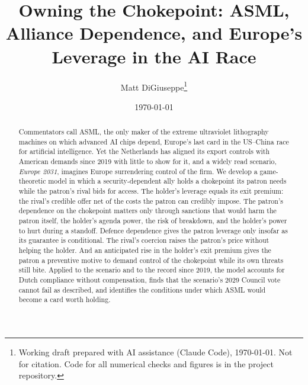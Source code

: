 \documentclass[11pt]{article}
\title{Owning the Chokepoint: ASML, Alliance Dependence, and Europe's Leverage in the AI Race}
\author{Matt DiGiuseppe\thanks{Working draft prepared with AI assistance (Claude Code), \today. Not for citation. Code for all numerical checks and figures is in the project repository.}}
\date{\today}
\begin{document}
\maketitle

\begin{abstract}
\noindent Commentators call ASML, the only maker of the extreme ultraviolet lithography machines on which advanced AI chips depend, Europe's last card in the US--China race for artificial intelligence. Yet the Netherlands has aligned its export controls with American demands since 2019 with little to show for it, and a widely read scenario, \emph{Europe 2031}, imagines Europe surrendering control of the firm. We develop a game-theoretic model in which a security-dependent ally holds a chokepoint its patron needs while the patron's rival bids for access. The holder's leverage equals its exit premium: the rival's credible offer net of the costs the patron can credibly impose. The patron's dependence on the chokepoint matters only through sanctions that would harm the patron itself, the holder's agenda power, the risk of breakdown, and the holder's power to hurt during a standoff. Defence dependence gives the patron leverage only insofar as its guarantee is conditional. The rival's coercion raises the patron's price without helping the holder. And an anticipated rise in the holder's exit premium gives the patron a preventive motive to demand control of the chokepoint while its own threats still bite. Applied to the scenario and to the record since 2019, the model accounts for Dutch compliance without compensation, finds that the scenario's 2029 Council vote cannot fail as described, and identifies the conditions under which ASML would become a card worth holding.
\end{abstract}

\newpage










{\raggedright


}

\appendix

\end{document}
